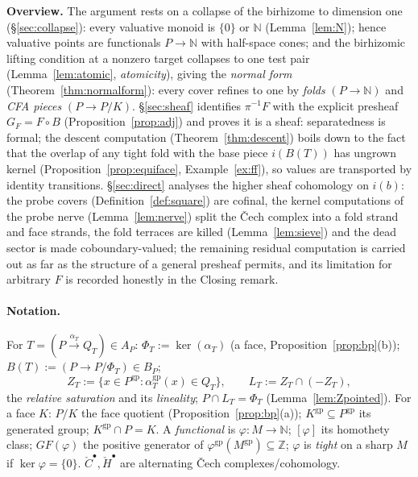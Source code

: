 \documentclass[11pt]{article}
\theoremstyle{definition}
\newcommand{\gp}{\mathrm{gp}}
\newcommand{\HH}{\check{H}}
\newcommand{\cC}{\check{C}}
\newcommand{\Z}{\mathbb{Z}}
\begin{document}
\noindent\textbf{Overview.}
The argument rests on a collapse of the birhizome to dimension one
(\S\ref{sec:collapse}): every valuative monoid is $\{0\}$ or $\mathbb N$
(Lemma~\ref{lem:N}); hence valuative points are functionals
$P\to\mathbb N$ with half-space cones; and the birhizomic lifting
condition at a nonzero target collapses to one test pair
(Lemma~\ref{lem:atomic}, \emph{atomicity}), giving the \emph{normal
form} (Theorem~\ref{thm:normalform}): every cover refines to one by
\emph{folds} $(P\to\mathbb N)$ and \emph{CFA pieces} $(P\to P/K)$.
\S\ref{sec:sheaf} identifies $\pi^{-1}F$ with the explicit presheaf
$G_F=F\circ B$ (Proposition~\ref{prop:adj}) and proves it is a sheaf:
separatedness is formal; the descent computation
(Theorem~\ref{thm:descent}) boils down to the fact that the overlap of
any tight fold with the base piece $i(B(T))$ has ungrown kernel
(Proposition~\ref{prop:equiface}, Example~\ref{ex:ff}), so values are
transported by identity transitions. \S\ref{sec:direct} analyses the
higher sheaf cohomology on $i(b)$: the probe covers
(Definition~\ref{def:square}) are cofinal, the kernel computations of
the probe nerve (Lemma~\ref{lem:nerve}) split the \v{C}ech complex
into a fold strand and face strands, the fold terraces are killed
(Lemma~\ref{lem:sieve}) and the dead sector is made coboundary-valued;
the remaining residual computation is carried out as far as the
structure of a general presheaf permits, and its limitation for
arbitrary $F$ is recorded honestly in the Closing remark.


\paragraph{Notation.} For $T=(P\xrightarrow{\alpha_T}Q_T)\in A_P$:
$\Phi_T:=\ker(\alpha_T)$ (a face, Proposition~\ref{prop:bp}(b));
$B(T):=(P\to P/\Phi_T)\in B_P$;
\[
Z_T:=\{x\in P^{\gp}:\alpha_T^{\gp}(x)\in Q_T\},\qquad
L_T:=Z_T\cap(-Z_T),
\]
the \emph{relative saturation} and its \emph{lineality};
$P\cap L_T=\Phi_T$ (Lemma~\ref{lem:Zpointed}). For a face $K$: $P/K$
the face quotient (Proposition~\ref{prop:bp}(a));
$K^{\gp}\subseteq P^{\gp}$ its generated group; $K^{\gp}\cap P=K$.
A \emph{functional} is $\varphi:M\to\mathbb N$; $[\varphi]$ its
homothety class; ${GF}(\varphi)$ the positive generator of
$\varphi^{\gp}(M^{\gp})\subseteq\Z$; $\varphi$ is \emph{tight} on a
sharp $M$ if $\ker\varphi=\{0\}$. $\cC^\bullet,\HH^\bullet$ are
alternating \v{C}ech complexes/cohomology.
\end{document}
